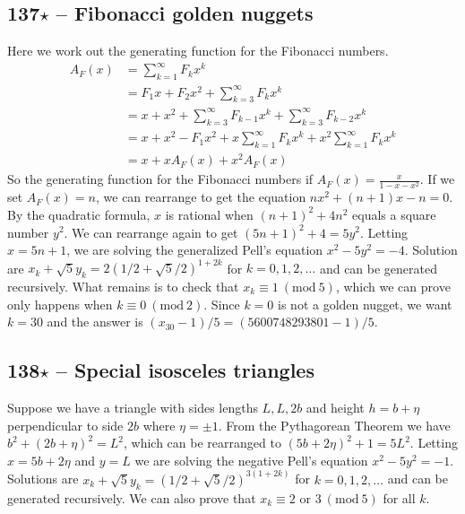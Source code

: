 \documentclass{article}
\newcommand{\Mod}[1]{\ (\mathrm{mod}\ #1)}
\begin{document}
\subsection*{137$\star$ -- Fibonacci golden nuggets} 
Here we work out the generating function for the Fibonacci numbers.
\begin{align*}
A_F(x) &= \sum\limits_{k=1}^\infty F_k x^k \\
&= F_1x + F_2x^2 + \sum\limits_{k=3}^\infty F_k x^k \\
&= x + x^2 + \sum\limits_{k=3}^\infty F_{k-1} x^k +  \sum\limits_{k=3}^\infty F_{k-2} x^k \\
&= x + x^2  - F_1x^2 + x\sum\limits_{k=1}^\infty F_k x^k +  x^2\sum\limits_{k=1}^\infty F_k x^k \\
&=  x + xA_F(x) + x^2A_F(x)
\end{align*}
So the generating function for the Fibonacci numbers if $A_F(x) = \frac{x}{1-x-x^2}$.
If we set $A_F(x) = n$, we can rearrange to get the equation $nx^2 + (n+1)x - n = 0$. 
By the quadratic formula, $x$ is rational when $(n+1)^2 + 4n^2$ equals a square number $y^2$. 
We can rearrange again to get $(5n+1)^2 + 4 = 5y^2$. 
Letting $x=5n+1$, we are solving the generalized Pell's equation $x^2 - 5y^2  = -4$. 
Solution are $x_k + \sqrt{5}y_k = 2(1/2 + \sqrt{5}/2)^{1 + 2k}$ for $k = 0, 1, 2, \dotsc$ and can be generated recursively. 
What remains is to check that $x_k \equiv 1 \Mod{5}$, which we can prove only happens when $k \equiv 0 \Mod 2$.
Since $k=0$ is not a golden nugget, we want $k=30$ and the answer is $(x_{30} - 1)/5 = \boxed{(5600748293801 - 1)/5}$.

\subsection*{138$\star$ -- Special isosceles triangles} 
Suppose we have a triangle with sides lengths $L, L, 2b$ and height $h = b + \eta$ perpendicular to side $2b$ where $\eta = \pm 1$. 
From the Pythagorean Theorem we have $b^2 + (2b+\eta)^2 = L^2$, which can be rearranged to $(5b+2\eta)^2+1 = 5L^2$. 
Letting $x = 5b+2\eta$ and $y= L$ we are solving the negative Pell's equation $x^2 - 5y^2 = -1$. 
Solutions are $x_k + \sqrt{5} y_k = (1/2 + \sqrt{5}/2)^{3(1 + 2k)}$ for $k = 0, 1, 2, \dotsc$ and can be generated recursively. 
We can also prove that $x_k \equiv 2$ or $3 \Mod{5}$ for all $k$. 
\end{document}
